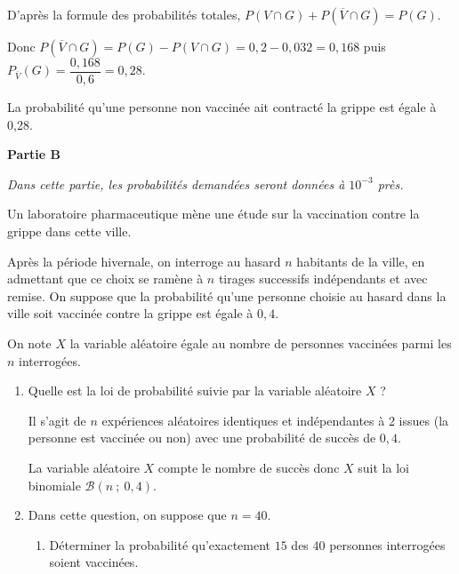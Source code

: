 \documentclass[12pt]{cornouaille}
\begin{document}
\begin{exercice}
\begin{enumerate}
\begin{solution}
D'après la formule des probabilités totales, $P(V \cap G) + P\left(\overline{V} \cap G\right) = P\left(G\right)$.\smallskip 
	
Donc $P\left(\overline{V} \cap G\right) = P(G) - P(V \cap G) = 0,2 - 0,032 = 0,168$ puis $P_{\overline{V}} (G) = \dfrac{0,168}{0,6} =0,28$.

La probabilité qu'une personne non vaccinée ait contracté la grippe est égale à 0,28.
\end{solution}
\end{enumerate}

\bigskip

\textbf{Partie B}

\medskip

\emph{Dans cette partie, les probabilités demandées seront données à $10^{-3}$ près.}

\medskip

Un laboratoire pharmaceutique mène une étude sur la vaccination contre la grippe dans cette
ville.

\medskip

Après la période hivernale, on interroge au hasard $n$ habitants de la ville, en admettant que ce choix se ramène à $n$ tirages successifs indépendants et avec remise. On suppose que la probabilité qu'une personne choisie au hasard dans la ville soit vaccinée contre la grippe est égale à $0,4$.

On note $X$ la variable aléatoire égale au nombre de personnes vaccinées parmi les $n$
interrogées.

\medskip

\begin{enumerate}
\item Quelle est la loi de probabilité suivie par la variable aléatoire $X$ ?

\begin{solution}
Il s'agit de $n$ expériences aléatoires identiques et indépendantes à 2 issues (la personne est vaccinée ou non) avec une probabilité de succès de $0,4$.\smallskip 
	
La variable aléatoire $X$ compte le nombre de succès donc $X$ suit la loi binomiale $\mathcal{B}(n~;~0,4)$.
\end{solution}
\item Dans cette question, on suppose que $n = 40$.
	\begin{enumerate}
		\item Déterminer la probabilité qu'exactement $15$ des $40$ personnes interrogées soient vaccinées.


\end{enumerate}
\end{enumerate}
\end{exercice}
\end{document}
